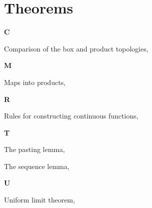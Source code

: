 \section*{Theorems}

\vspace{1em}\noindent\large{\textbf{C}}

Comparison of the box and product topologies, \pageref{theorem:ComparisonOfBoxProductTopology}

\vspace{1em}\noindent\large{\textbf{M}}

Maps into products, \pageref{theorem:MapsIntoProducts}

\vspace{1em}\noindent\large{\textbf{R}}

Rules for constructing continuous functions, \pageref{theorem:RulesForConstructingContinuousFunctions}

\vspace{1em}\noindent\large{\textbf{T}}

The pasting lemma, \pageref{theorem:ThePastingLemma}

The sequence lemma, \pageref{theorem:TheSequenceLemma}

\vspace{1em}\noindent\large{\textbf{U}}

Uniform limit theorem, \pageref{theorem:UniformLimitTheorem}

